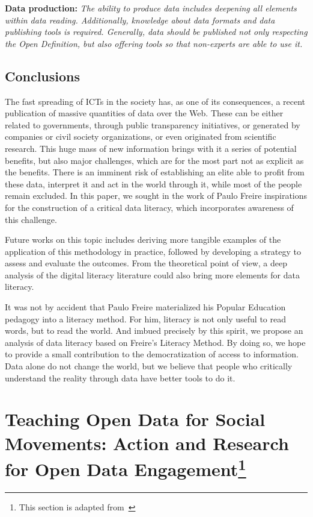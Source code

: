 \noindent \textbf{Data production:} \emph{The ability to produce data includes deepening all elements within data reading. Additionally, knowledge about data formats and data publishing tools is required. Generally, data should be published not only respecting the Open Definition, but also offering tools so that non-experts are able to use it.}



\subsection{Conclusions}

The fast spreading of ICTs in the society has, as one of its consequences, a recent publication of massive quantities of data over the Web. These can be either related to governments, through public transparency initiatives, or generated by companies or civil society organizations, or even originated from scientific research. This huge mass of new information brings with it a series of potential benefits, but also major challenges, which are for the most part not as explicit as the benefits. There is an imminent risk of establishing an elite able to profit from these data, interpret it and act in the world through it, while most of the people remain excluded. In this paper, we sought in the work of Paulo Freire inspirations for the construction of a critical data literacy, which incorporates awareness of this challenge.

Future works on this topic includes deriving more tangible examples of the application of this methodology in practice, followed by developing a strategy to assess and evaluate the outcomes. From the theoretical point of view, a deep analysis of the digital literacy literature could also bring more elements for data literacy. 

It was not by accident that Paulo Freire materialized his Popular Education pedagogy into a literacy method. For him, literacy is not only useful to read words, but to read the world. And imbued precisely by this spirit, we propose an analysis of data literacy based on Freire's Literacy Method. By doing so, we hope to provide a small contribution to the democratization of access to information. Data alone do not change the world, but we believe that people who critically understand the reality through data have better tools to do it.

\section[Teaching Open Data for Social Movements: Action and Research for Open Data Engagement]{Teaching Open Data for Social Movements: Action and Research for Open Data Engagement\footnote{This section is adapted from~}}

